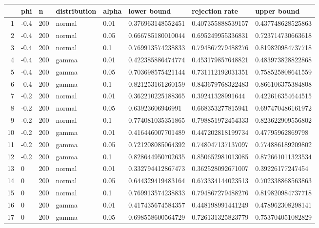 \begin{table}[ht]
\centering
\begin{tabular}{rlllllll}
  \hline
 & phi & n & distribution & alpha & lower bound & rejection rate & upper bound \\ 
  \hline
1 & -0.4 & 200 & normal & 0.01 & 0.376963148552451 & 0.407355888539157 & 0.437748628525863 \\ 
  2 & -0.4 & 200 & normal & 0.05 & 0.666785180010044 & 0.695249955336831 & 0.723714730663618 \\ 
  3 & -0.4 & 200 & normal & 0.1 & 0.769913574238833 & 0.794867279488276 & 0.819820984737718 \\ 
  4 & -0.4 & 200 & gamma & 0.01 & 0.422385886474774 & 0.453179857648821 & 0.483973828822868 \\ 
  5 & -0.4 & 200 & gamma & 0.05 & 0.703698575421144 & 0.731112192031351 & 0.758525808641559 \\ 
  6 & -0.4 & 200 & gamma & 0.1 & 0.821253161260159 & 0.843679768322483 & 0.866106375384808 \\ 
  7 & -0.2 & 200 & normal & 0.01 & 0.362210225188365 & 0.39241328991644 & 0.422616354644515 \\ 
  8 & -0.2 & 200 & normal & 0.05 & 0.63923606946991 & 0.668353277815941 & 0.697470486161972 \\ 
  9 & -0.2 & 200 & normal & 0.1 & 0.774081035351865 & 0.798851972454333 & 0.823622909556802 \\ 
  10 & -0.2 & 200 & gamma & 0.01 & 0.416446007701489 & 0.447202818199734 & 0.47795962869798 \\ 
  11 & -0.2 & 200 & gamma & 0.05 & 0.721208085064392 & 0.748047137137097 & 0.774886189209802 \\ 
  12 & -0.2 & 200 & gamma & 0.1 & 0.828644950702635 & 0.850652981013085 & 0.872661011323534 \\ 
  13 & 0 & 200 & normal & 0.01 & 0.332794412867473 & 0.362528092671007 & 0.39226177247454 \\ 
  14 & 0 & 200 & normal & 0.05 & 0.644329419483164 & 0.673334144023513 & 0.702338868563863 \\ 
  15 & 0 & 200 & normal & 0.1 & 0.769913574238833 & 0.794867279488276 & 0.819820984737718 \\ 
  16 & 0 & 200 & gamma & 0.01 & 0.417435674584357 & 0.448198991441249 & 0.478962308298141 \\ 
  17 & 0 & 200 & gamma & 0.05 & 0.698558600564729 & 0.726131325823779 & 0.753704051082829 \\ 

\end{tabular}
\end{table}
